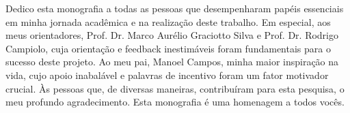 
\begin{dedicatoria}%

Dedico esta monografia a todas as pessoas que desempenharam papéis essenciais em minha jornada acadêmica e na realização deste trabalho. Em especial, aos meus orientadores, Prof. Dr. Marco Aurélio Graciotto Silva e Prof. Dr. Rodrigo Campiolo, cuja orientação e feedback inestimáveis foram fundamentais para o sucesso deste projeto. Ao meu pai, Manoel Campos, minha maior inspiração na vida, cujo apoio inabalável e palavras de incentivo foram um fator motivador crucial. Às pessoas que, de diversas maneiras, contribuíram para esta pesquisa, o meu profundo agradecimento. Esta monografia é uma homenagem a todos vocês.

\end{dedicatoria}
